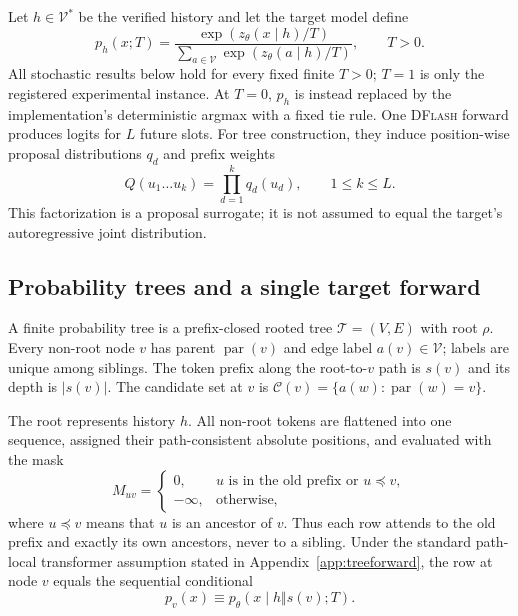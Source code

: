 \documentclass{article}
\newcommand{\V}{\mathcal{V}}
\newcommand{\T}{\mathcal{T}}
\newcommand{\C}{\mathcal{C}}
\newcommand{\parn}{\operatorname{par}}
\newcommand{\DFlash}{\textnormal{\textsc{DFlash}}}
\begin{document}
Let $h\in\V^*$ be the verified history and let the target model define
\begin{equation}
  p_h(x;T)=\frac{\exp(z_\theta(x\mid h)/T)}
  {\sum_{a\in\V}\exp(z_\theta(a\mid h)/T)},\qquad T>0.
  \label{eq:target}
\end{equation}
All stochastic results below hold for every fixed finite $T>0$; $T=1$ is only the registered experimental instance.  At $T=0$, $p_h$ is instead replaced by the implementation's deterministic argmax with a fixed tie rule.  One \DFlash{} forward produces logits for $L$ future slots.  For tree construction, they induce position-wise proposal distributions $q_d$ and prefix weights
\begin{equation}
  Q(u_1\ldots u_k)=\prod_{d=1}^{k}q_d(u_d),\qquad 1\leq k\leq L.
  \label{eq:draftprefix}
\end{equation}
This factorization is a proposal surrogate; it is not assumed to equal the target's autoregressive joint distribution.

\subsection{Probability trees and a single target forward}

A finite probability tree is a prefix-closed rooted tree $\T=(V,E)$ with root $\rho$.  Every non-root node $v$ has parent $\parn(v)$ and edge label $a(v)\in\V$; labels are unique among siblings.  The token prefix along the root-to-$v$ path is $s(v)$ and its depth is $|s(v)|$.  The candidate set at $v$ is
$\C(v)=\{a(w):\parn(w)=v\}$.

The root represents history $h$.  All non-root tokens are flattened into one sequence, assigned their path-consistent absolute positions, and evaluated with the mask
\begin{equation}
M_{uv}=\begin{cases}
0,&u\text{ is in the old prefix or }u\preceq v,\\
-\infty,&\text{otherwise},
\end{cases}
\label{eq:mask}
\end{equation}
where $u\preceq v$ means that $u$ is an ancestor of $v$.  Thus each row attends to the old prefix and exactly its own ancestors, never to a sibling.  Under the standard path-local transformer assumption stated in Appendix~\ref{app:treeforward}, the row at node $v$ equals the sequential conditional
\begin{equation}
  p_v(x) \equiv p_\theta(x\mid h\Vert s(v);T).
  \label{eq:nodeconditional}
\end{equation}
\end{document}
